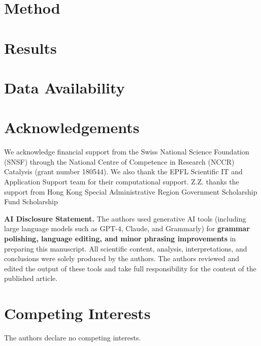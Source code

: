 \documentclass[%
 preprint,
superscriptaddress,
 amsmath,amssymb,
 aps,
 linenumbers,
]{revtex4-2}
\begin{document}
\section{Method}
\label{sec:methods}


\section{Results}





\section*{Data Availability}





\section*{Acknowledgements}
We acknowledge financial support from the Swiss National Science Foundation (SNSF) through the National Centre of Competence in Research (NCCR) Catalysis (grant number 180544). We also thank the EPFL Scientific IT and Application Support team for their computational support. Z.Z. thanks the support from Hong Kong Special Administrative Region Government Scholarship Fund Scholarship

\textbf{AI Disclosure Statement.}
The authors used generative AI tools (including large language models such as GPT-4, Claude, and Grammarly) for \textbf{grammar polishing, language editing, and minor phrasing improvements} in preparing this manuscript. All scientific content, analysis, interpretations, and conclusions were solely produced by the authors. The authors reviewed and edited the output of these tools and take full responsibility for the content of the published article.


\section*{Competing Interests}

The authors declare no competing interests.



\end{document}
